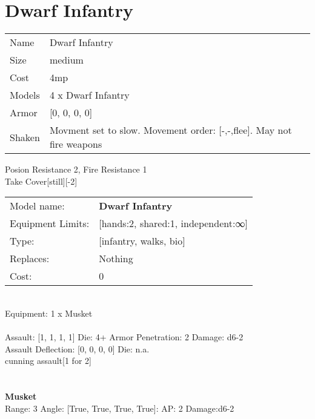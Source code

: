\pagebreak

\section{ Dwarf Infantry }

\begin{tabular}{ll}
  Name & Dwarf Infantry \\
  Size & medium\\
  Cost & 4mp\\
  Models & 4 x Dwarf Infantry\\
  Armor & [0, 0, 0, 0]\\
  Shaken & Movment set to slow. Movement order: [-,-,flee]. May not fire weapons\\
\end{tabular}

\noindent Posion Resistance 2, Fire Resistance 1\\ 
Take Cover[still][-2]\\ 


\noindent
\begin{tabular}{ll}
Model name: &{\bf Dwarf Infantry } \\
Equipment Limits: &[hands:2, shared:1, independent:∞] \\
Type: &[infantry, walks, bio] \\
Replaces: &Nothing \\
Cost: & 0\\
\end{tabular}
\ \\
Equipment: 1 x Musket \\
\ \\
Assault: [1, 1, 1, 1] Die: 4+ Armor Penetration: 2 Damage: d6-2 \\
Assault Deflection: [0, 0, 0, 0] Die: n.a.\\
\indent cunning assault[1 for 2]\\ 
 
\ \\

\ \\
{\bf Musket } \\



Range: 3  Angle: [True, True, True, True]: AP: 2 Damage:d6-2 \\




 
\ \\



